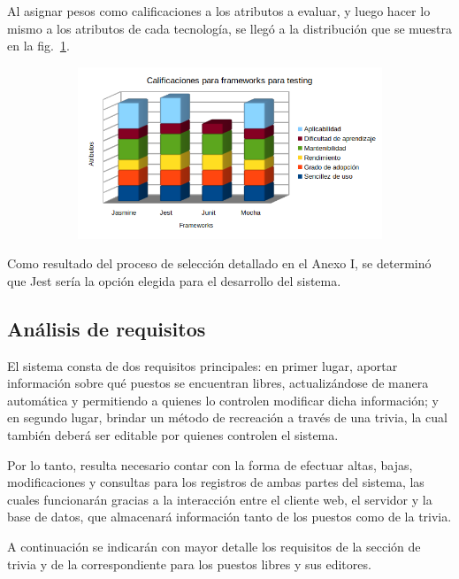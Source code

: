 \documentclass{article}
\begin{document}
Al asignar pesos como calificaciones a los atributos a evaluar, y luego hacer lo mismo a los atributos de cada tecnología, se llegó a la distribución que se muestra en la fig.~\ref{fig:testing}.
\begin{figure}[H]
	\caption{Gráfico de calificaciones de frameworks para hacer testing del código}
    \begin{subfigure}{1\textwidth}
	\includegraphics[width=1\textwidth]{calificaciones para frameworks para testing.png}
    \end{subfigure}
	\label{fig:testing}
\end{figure}
\vspace{-1.0\baselineskip}
Como resultado del proceso de selección detallado en el Anexo I, se determinó que Jest sería la opción elegida para el desarrollo del sistema.
\newpage
\subsection{Análisis de requisitos}
El sistema consta de dos requisitos principales: en primer lugar, aportar información sobre qué puestos se encuentran libres, actualizándose de manera automática y permitiendo a quienes lo controlen modificar dicha información; y en segundo lugar, brindar un método de recreación a través de una trivia, la cual también deberá ser editable por quienes controlen el sistema.

Por lo tanto, resulta necesario contar con la forma de efectuar altas, bajas, modificaciones y consultas para los registros de ambas partes del sistema, las cuales funcionarán gracias a la interacción entre el cliente web, el servidor y la base de datos, que almacenará información tanto de los puestos como de la trivia.

A continuación se indicarán con mayor detalle los requisitos de la sección de trivia y de la correspondiente para los puestos libres y sus editores.
\end{document}
